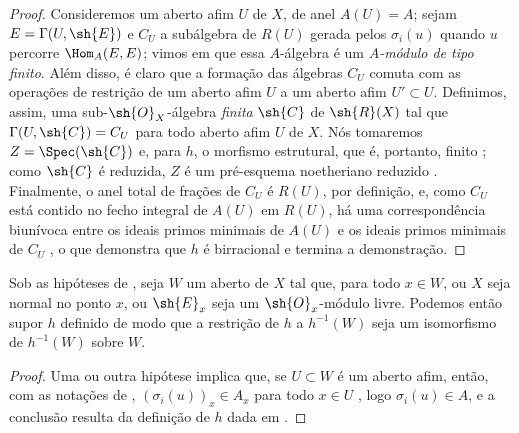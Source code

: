 \documentclass[oneside,10pt]{amsart}
\newcommand{\oldpage}[2][]{\marginnote{\normalfont\footnotesize\textbf{#1}~|~#2}\ignorespaces}
\let\EGAOriginalLabel\label
\renewcommand{\label}[1]{\phantomsection\EGAOriginalLabel{#1}}
\begin{document}
\begin{proof}
Consideremos um aberto afim $U$ de $X$, de anel $A(U)=A$;
sejam $E=\Gamma(U,\sh{E})$ e $C_U$ a subálgebra de $R(U)$ gerada pelos $\sigma_i(u)$ quando $u$ percorre $\Hom_A(E,E)$;
vimos em  que essa $A$-álgebra é um \emph{$A$-módulo de tipo finito}.
Além disso, é claro que a formação das álgebras $C_U$ comuta com as operações de restrição de um aberto afim $U$ a um aberto afim $U'\subset U$.
Definimos, assim, uma sub-$\sh{O}_X$-álgebra \emph{finita} $\sh{C}$ de $\sh{R}(X)$ tal que $\Gamma(U,\sh{C})=C_U$ para todo aberto afim $U$ de $X$. Nós
\oldpage[II]{133}
tomaremos $Z=\Spec(\sh{C})$ e, para $h$, o morfismo estrutural, que é, portanto, finito ;
como $\sh{C}$ é reduzida, $Z$ é um pré-esquema noetheriano reduzido .
Finalmente, o anel total de frações de $C_U$ é $R(U)$, por definição, e, como $C_U$ está contido no fecho integral de $A(U)$ em $R(U)$, há uma correspondência biunívoca entre os ideais primos minimais de $A(U)$ e os ideais primos minimais de $C_U$ \cite[t.~I, p.~259]{I-13}, o que demonstra que $h$ é birracional e termina a demonstração.
\end{proof}

\begin{corollary}[6.6.7]
\label{II.6.6.7}
Sob as hipóteses de , seja $W$ um aberto de $X$ tal que, para todo $x\in W$, ou $X$ seja normal no ponto $x$, ou $\sh{E}_x$ seja um $\sh{O}_x$-módulo livre.
Podemos então supor $h$ definido de modo que a restrição de $h$ a $h^{-1}(W)$ seja um isomorfismo de $h^{-1}(W)$ sobre $W$.
\end{corollary}

\begin{proof}
Uma ou outra hipótese implica que, se $U\subset W$ é um aberto afim, então, com as notações de , $(\sigma_i(u))_x\in A_x$ para todo $x\in U$ , logo $\sigma_i(u)\in A$, e a conclusão resulta da definição de $h$ dada em .
\end{proof}
\end{document}
